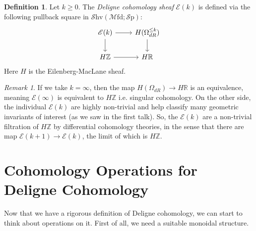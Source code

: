 \documentclass[10pt]{amsart}
\newcommand{\E}{\mathscr{E}}
\newcommand{\bR}{\mathbb{R}}
\newcommand{\bZ}{\mathbb{Z}}
\newcommand{\Sp}{\mathscr{S}\mathrm{p}}
\newcommand{\Ch}{\mathscr{C}\mathrm{h}}
\newcommand{\Mfd}{\mathscr{M}\mathrm{fd}}
\newcommand{\Shv}{\mathscr{S}\mathrm{hv}}
\newcommand{\nrnote}[1]{\todo[color=green!40,linecolor=green!40!black,size=\tiny]{#1}}
\theoremstyle{definition}
\newtheorem{definition}[equation]{Definition}
\theoremstyle{remark}
\newtheorem{remark}[equation]{Remark}
\begin{document}
\begin{definition}
  Let $k \geq 0$. The \emph{Deligne cohomology sheaf} $\E(k)$ is defined via the following pullback square in $\Shv(\Mfd; \Sp)$:
  \[
  \begin{tikzcd}
   \E(k) \arrow[r] \arrow[d] & H(\Omega_{dR}^{\leq k}) \arrow[d] \\
   H\bZ \arrow[r] & H \bR 
  \end{tikzcd}
  \]
  Here $H$ is the  Eilenberg-MacLane sheaf.
\end{definition}







\begin{remark}
  If we take $k = \infty$, then the map $H(\Omega_{dR}) \to H\bR$ is an equivalence, meaning $\E(\infty)$ is equivalent to $H\bZ$ i.e. singular cohomology. On the other side, the individual $\E(k)$ are highly non-trivial and help classify many geometric invariants of interest (as we saw in the first talk). So, the $\E(k)$ are a non-trivial filtration of $H\bZ$ by differential cohomology theories, in the sense that there are map $\E(k+1) \to \E(k)$, the limit of which is $H\bZ$.
\end{remark}


\section{Cohomology Operations for Deligne Cohomology}
Now that we have a rigorous definition of Deligne cohomology, we can start to think about operations on it. First of all, we need a suitable monoidal structure. 
\end{document}
